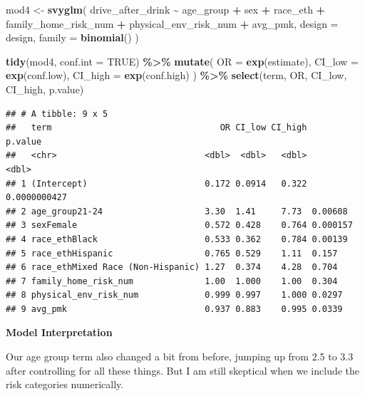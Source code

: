 \documentclass[
]{article}
\newenvironment{Shaded}{\begin{snugshade}}{\end{snugshade}}
\newcommand{\AttributeTok}[1]{\textcolor[rgb]{0.13,0.29,0.53}{#1}}
\newcommand{\ConstantTok}[1]{\textcolor[rgb]{0.56,0.35,0.01}{#1}}
\newcommand{\FunctionTok}[1]{\textcolor[rgb]{0.13,0.29,0.53}{\textbf{#1}}}
\newcommand{\NormalTok}[1]{#1}
\newcommand{\OtherTok}[1]{\textcolor[rgb]{0.56,0.35,0.01}{#1}}
\newcommand{\SpecialCharTok}[1]{\textcolor[rgb]{0.81,0.36,0.00}{\textbf{#1}}}
\begin{document}
\begin{Shaded}
\begin{Highlighting}[]
\NormalTok{mod4 }\OtherTok{\textless{}{-}} \FunctionTok{svyglm}\NormalTok{(}
\NormalTok{  drive\_after\_drink }\SpecialCharTok{\textasciitilde{}}\NormalTok{ age\_group }\SpecialCharTok{+}\NormalTok{ sex }\SpecialCharTok{+}\NormalTok{ race\_eth }\SpecialCharTok{+}
\NormalTok{  family\_home\_risk\_num }\SpecialCharTok{+}
\NormalTok{  physical\_env\_risk\_num }\SpecialCharTok{+}\NormalTok{ avg\_pmk,}
  \AttributeTok{design =}\NormalTok{ design,}
  \AttributeTok{family =} \FunctionTok{binomial}\NormalTok{()}
\NormalTok{) }

\FunctionTok{tidy}\NormalTok{(mod4, }\AttributeTok{conf.int =} \ConstantTok{TRUE}\NormalTok{) }\SpecialCharTok{\%\textgreater{}\%}
  \FunctionTok{mutate}\NormalTok{(}
    \AttributeTok{OR =} \FunctionTok{exp}\NormalTok{(estimate),}
    \AttributeTok{CI\_low =} \FunctionTok{exp}\NormalTok{(conf.low),}
    \AttributeTok{CI\_high =} \FunctionTok{exp}\NormalTok{(conf.high)}
\NormalTok{  ) }\SpecialCharTok{\%\textgreater{}\%}
  \FunctionTok{select}\NormalTok{(term, OR, CI\_low, CI\_high, p.value)}
\end{Highlighting}
\end{Shaded}

\begin{verbatim}
## # A tibble: 9 x 5
##   term                                 OR CI_low CI_high      p.value
##   <chr>                             <dbl>  <dbl>   <dbl>        <dbl>
## 1 (Intercept)                       0.172 0.0914   0.322 0.0000000427
## 2 age_group21-24                    3.30  1.41     7.73  0.00608     
## 3 sexFemale                         0.572 0.428    0.764 0.000157    
## 4 race_ethBlack                     0.533 0.362    0.784 0.00139     
## 5 race_ethHispanic                  0.765 0.529    1.11  0.157       
## 6 race_ethMixed Race (Non-Hispanic) 1.27  0.374    4.28  0.704       
## 7 family_home_risk_num              1.00  1.000    1.00  0.304       
## 8 physical_env_risk_num             0.999 0.997    1.000 0.0297      
## 9 avg_pmk                           0.937 0.883    0.995 0.0339
\end{verbatim}

\textbf{Model Interpretation}

Our age group term also changed a bit from before, jumping up from 2.5
to 3.3 after controlling for all these things. But I am still skeptical
when we include the risk categories numerically.
\end{document}
